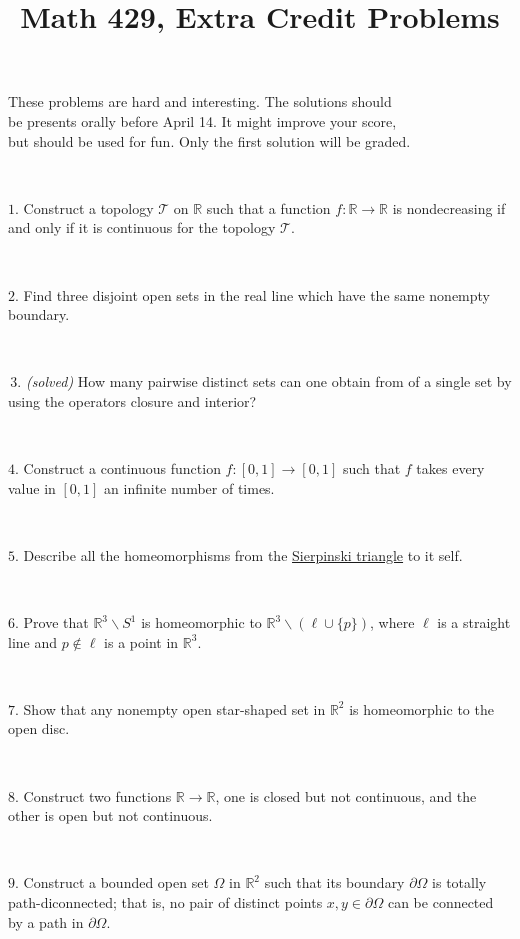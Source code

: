 \documentclass{article}
\def\noi{\noindent}%
\def\RR{\mathbb{R}}%
\def\:{\colon}
\begin{document}
\title{Math 429, Extra Credit Problems}
\author{}
\date{}
\maketitle

\begin{center}
{\small These problems are hard and interesting. The solutions should \\
be presents orally before April 14. It might improve your score,\\
but should be used for fun. Only the first solution will be graded.}
\end{center}
\thispagestyle{empty}

\ 


\noi $1$. Construct a topology $\mathcal{T}$ on $\RR$ such that a function $f\:\RR\to\RR$ is nondecreasing if and only if it is continuous for the topology $\mathcal{T}$.

\ 


\noi $2$. 
Find three disjoint open sets in the real line 
which have the same nonempty boundary. 

\ 

\noi \sout{$\,3.$} \textit{(solved)} How many pairwise distinct sets can one obtain
from of a single set by using the operators closure and interior?

\ 

\noi $4$. Construct a continuous function 
$f\:[0,1]\rightarrow [0,1]$ such that $f$ takes every value in $[0,1]$ 
an infinite number of times.

\ 

\noi $5$. Describe all the homeomorphisms from the \href{http://en.wikipedia.org/wiki/Sierpinski_triangle}{Sierpinski triangle} to it self.

\ 

\noi $6$. Prove that $\RR^3\backslash S^1$ is homeomorphic to $\RR^3\backslash (\ell\cup \{p\})$, where $\ell$ is a straight line and $p\not\in\ell$ is a point in $\RR^3$.


\ 


\noi $7.$ Show that any nonempty open star-shaped set in $\RR^2$ is homeomorphic to the open disc.

\ 


\noi $8.$ Construct two functions $\RR\to\RR$, one is closed but not continuous, and the other is open but not continuous.

\ 

\noi $9.$
Construct a bounded open set $\Omega$ in $\RR^2$
such that its boundary $\partial \Omega$ is totally path-diconnected;
that is, no pair of distinct points $x,y\in\partial \Omega$ can be connected by a path in $\partial \Omega$.
\end{document}
